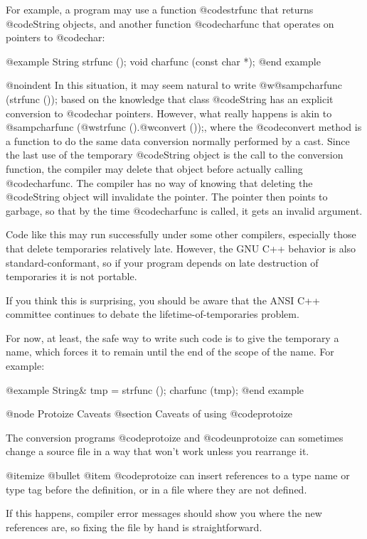 For example, a program may use a function @code{strfunc} that returns
@code{String} objects, and another function @code{charfunc} that
operates on pointers to @code{char}:

@example
String strfunc ();
void charfunc (const char *);
@end example

@noindent
In this situation, it may seem natural to write @w{@samp{charfunc
(strfunc ());}} based on the knowledge that class @code{String} has an
explicit conversion to @code{char} pointers.  However, what really
happens is akin to @samp{charfunc (@w{strfunc ()}.@w{convert ()});},
where the @code{convert} method is a function to do the same data
conversion normally performed by a cast.  Since the last use of the
temporary @code{String} object is the call to the conversion function,
the compiler may delete that object before actually calling
@code{charfunc}.  The compiler has no way of knowing that deleting the
@code{String} object will invalidate the pointer.  The pointer then
points to garbage, so that by the time @code{charfunc} is called, it
gets an invalid argument.

Code like this may run successfully under some other compilers,
especially those that delete temporaries relatively late.  However, the
GNU C++ behavior is also standard-conformant, so if your program depends
on late destruction of temporaries it is not portable.

If you think this is surprising, you should be aware that the ANSI C++
committee continues to debate the lifetime-of-temporaries problem.

For now, at least, the safe way to write such code is to give the
temporary a name, which forces it to remain until the end of the scope of
the name.  For example:

@example
String& tmp = strfunc ();
charfunc (tmp);
@end example

@node Protoize Caveats
@section Caveats of using @code{protoize}

The conversion programs @code{protoize} and @code{unprotoize} can
sometimes change a source file in a way that won't work unless you
rearrange it.

@itemize @bullet
@item
@code{protoize} can insert references to a type name or type tag before
the definition, or in a file where they are not defined.

If this happens, compiler error messages should show you where the new
references are, so fixing the file by hand is straightforward.

